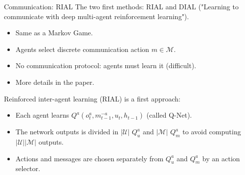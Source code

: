 \documentclass[9pt, hyperref={pdfusetitle,colorlinks=true,allcolors=DarkBlue}]{beamer}
\begin{document}
\begin{frame}{Communication: RIAL}
The two first methods: RIAL and DIAL ("Learning to communicate with deep multi-agent reinforcement learning").

\begin{itemize}
    \item Same as a Markov Game.
    \item Agents select discrete communication action $m \in \mathcal{M}$.
    \item No communication protocol: agents must learn it (difficult).
    \item More details in the paper.
\end{itemize}
\vfill
Reinforced inter-agent learning (RIAL) is a first approach:
\begin{itemize}
    \item Each agent learns $Q^a(o^a_t, m^{-a}_{t-1}, u_t, h_{t-1})$ (called Q-Net).
    \item The network outputs is divided in $|\mathcal{U}|$ $Q^a_u$ and $|\mathcal{M}|$ $Q^a_m$ to avoid computing $|\mathcal{U}||\mathcal{M}|$ outputs.
    \item Actions and messages are chosen separately from $Q^a_u$ and $Q^a_m$ by an action selector.
\end{itemize}
\end{frame}
\end{document}
